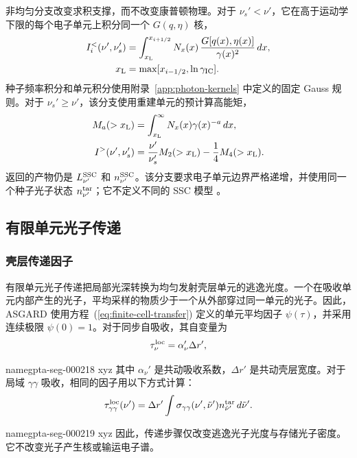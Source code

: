 \documentclass[twocolumn]{aastex702}
\makeatletter
\providecommand{\gptareaderanchor}[1]{\pdfdest name{#1} xyz}%
\providecommand{\gptareaderanchor}[1]{\special{pdf:dest (#1) [ @thispage /XYZ @xpos @ypos null ]}}%
\makeatother
\begin{document}
非均匀分支改变求积支撑，而不改变康普顿物理。对于 \(\nu_s'<\nu'\)，它在高于运动学下限的每个电子单元上积分同一个 \(G(q,\eta)\) 核，
\begin{equation}
\begin{aligned}
I_i^{<}(\nu',\nu_s')
&=\int_{x_{\rm L}}^{x_{i+1/2}}
N_x(x)\,\frac{G[q(x),\eta(x)]}{\gamma(x)^2}\,dx,\\
x_{\rm L}&=\max[x_{i-1/2},\ln\gamma_{\rm IC}].
\end{aligned}
\end{equation}
种子频率积分和单元积分使用附录~\ref{app:photon-kernels} 中定义的固定 Gauss 规则。对于 \(\nu_s'\ge\nu'\)，该分支使用重建单元的预计算高能矩，
\begin{equation}
\begin{aligned}
M_a(>x_{\rm L})&=\int_{x_{\rm L}}^\infty N_x(x)\gamma(x)^{-a}\,dx,\\
I^{>}(\nu',\nu_s')
&=\frac{\nu'}{\nu_s'}M_2(>x_{\rm L})-\frac{1}{4}M_4(>x_{\rm L}) .
\end{aligned}
\end{equation}
返回的产物仍是 \(L_{\nu'}^{\rm SSC}\) 和 \(n_{\nu'}^{\rm SSC}\)。该分支要求电子单元边界严格递增，并使用同一个种子光子状态 \(n_{\nu'}^{\rm tar}\)；它不定义不同的 SSC 模型 \citep{Jones1968,BlumenthalGould1970}。

\subsection{有限单元光子传递}

\subsubsection{壳层传递因子}

有限单元光子传递把局部光深转换为均匀发射壳层单元的逃逸光度。一个在吸收单元内部产生的光子，平均采样的物质少于一个从外部穿过同一单元的光子。因此，ASGARD 使用方程~(\ref{eq:finite-cell-transfer}) 定义的单元平均因子 \(\psi(\tau)\)，并采用连续极限 \(\psi(0)=1\)。对于同步自吸收，其自变量为
\[
\tau_\nu^{\rm loc}=\alpha_\nu'\Delta r',
\]

\gptareaderanchor{gpta-seg-000218}%
其中 \(\alpha_\nu'\) 是共动吸收系数，\(\Delta r'\) 是共动壳层宽度。对于局域 \(\gamma\gamma\) 吸收，相同的因子用以下方式计算：
\[
\tau_{\gamma\gamma}^{\rm loc}(\nu')
=\Delta r'\int \sigma_{\gamma\gamma}(\nu',\tilde\nu')
n_{\tilde\nu'}^{\rm tar}\,d\tilde\nu' .
\]

\gptareaderanchor{gpta-seg-000219}%
因此，传递步骤仅改变逃逸光子光度与存储光子密度。它不改变光子产生核或输运电子谱。
\end{document}
